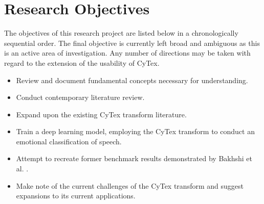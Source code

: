 \section{Research Objectives \label{sec:obj}}
The objectives of this research project are listed below in a chronologically sequential order. The final objective is currently left broad and ambiguous as this is an active area of investigation. Any number of directions may be taken with regard to the extension of the usability of CyTex.
\begin{itemize}
    \item Review and document fundamental concepts necessary for understanding.
    
    \item Conduct contemporary literature review.

    \item Expand upon the existing CyTex transform literature.
    
    \item Train a deep learning model, employing the CyTex transform to conduct an emotional classification of speech.
    
    \item Attempt to recreate former benchmark results demonstrated by Bakhshi et al. \cite{CyTexRef}.
    
    \item Make note of the current challenges of the CyTex transform and suggest expansions to its current applications. 
\end{itemize}



